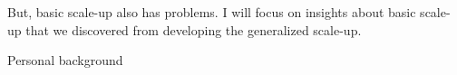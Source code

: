 \documentclass[aspectratio=169]{beamer}
\begin{document}
\begin{frame}

\begin{figure}
  \centering
  \hspace{0.0in}
  \hspace{0.0in}
\end{figure}

\end{frame}
\begin{frame}

But, basic scale-up also has problems.  I will focus on insights about basic scale-up that we discovered from developing the generalized scale-up.

\end{frame}
\begin{frame}

\LARGE{Personal background}

\end{frame}
\end{document}

